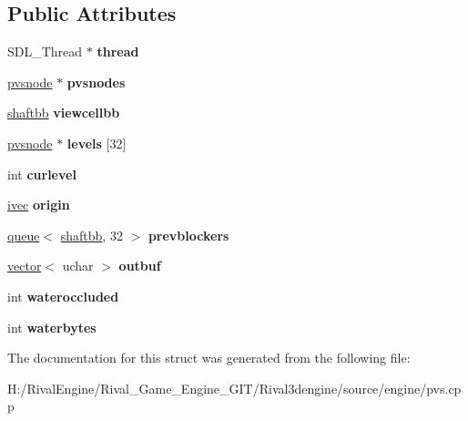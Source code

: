\subsection*{Public Attributes}
\begin{DoxyCompactItemize}
\item 
\mbox{\label{structpvsworker_a2398c2adcfd4ee7be83d4ac9d1861426}} 
S\+D\+L\+\_\+\+Thread $\ast$ {\bfseries thread}
\item 
\mbox{\label{structpvsworker_a9ffadfd487be7ea693e2be5961de1983}} 
\hyperlink{structpvsnode}{pvsnode} $\ast$ {\bfseries pvsnodes}
\item 
\mbox{\label{structpvsworker_aa6b6bfdb8a9dcbdf3ac49f9bb673b50e}} 
\hyperlink{structshaftbb}{shaftbb} {\bfseries viewcellbb}
\item 
\mbox{\label{structpvsworker_a746f20e03ead52c4de9c2516e777632e}} 
\hyperlink{structpvsnode}{pvsnode} $\ast$ {\bfseries levels} \mbox{[}32\mbox{]}
\item 
\mbox{\label{structpvsworker_a6b27bef841c401493c88e6553b9e7e26}} 
int {\bfseries curlevel}
\item 
\mbox{\label{structpvsworker_ae39af1c2421743ef109197f5af5a5568}} 
\hyperlink{structivec}{ivec} {\bfseries origin}
\item 
\mbox{\label{structpvsworker_a1f72299a86f04be022d2bd9c9470f92a}} 
\hyperlink{structqueue}{queue}$<$ \hyperlink{structshaftbb}{shaftbb}, 32 $>$ {\bfseries prevblockers}
\item 
\mbox{\label{structpvsworker_a72c398474391751292e51f58b2a9c4b5}} 
\hyperlink{structvector}{vector}$<$ uchar $>$ {\bfseries outbuf}
\item 
\mbox{\label{structpvsworker_af838d8898da28edd8a4065a3a3a868f7}} 
int {\bfseries wateroccluded}
\item 
\mbox{\label{structpvsworker_a3244f6e038c600e154d936df2ba238b6}} 
int {\bfseries waterbytes}
\end{DoxyCompactItemize}


The documentation for this struct was generated from the following file\+:\begin{DoxyCompactItemize}
\item 
H\+:/\+Rival\+Engine/\+Rival\+\_\+\+Game\+\_\+\+Engine\+\_\+\+G\+I\+T/\+Rival3dengine/source/engine/pvs.\+cpp\end{DoxyCompactItemize}
